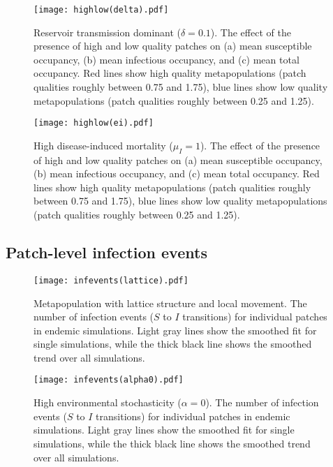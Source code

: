 \documentclass{svjour3}
\begin{document}
\begin{figure}
\centering
\texttt{[image: highlow(delta).pdf]}
\caption{Reservoir transmission dominant ($\delta = 0.1$).  The effect of the presence of high and low quality patches on (a) mean susceptible occupancy, (b) mean infectious occupancy, and (c) mean total occupancy.  Red lines show high quality metapopulations (patch qualities roughly between 0.75 and 1.75), blue lines show low quality metapopulations (patch qualities roughly between 0.25 and 1.25).}
\label{sens_delta}
\end{figure}

\begin{figure}
\centering
\texttt{[image: highlow(ei).pdf]}
\caption{High disease-induced mortality ($\mu_I = 1$).  The effect of the presence of high and low quality patches on (a) mean susceptible occupancy, (b) mean infectious occupancy, and (c) mean total occupancy.  Red lines show high quality metapopulations (patch qualities roughly between 0.75 and 1.75), blue lines show low quality metapopulations (patch qualities roughly between 0.25 and 1.25).}
\label{sens_ei}
\end{figure}

\clearpage

\subsection{Patch-level infection events}

\begin{figure}[h!]
\centering
\texttt{[image: infevents(lattice).pdf]}
\caption{Metapopulation with lattice structure and local movement.  The number of infection events ($S$ to $I$ transitions) for individual patches in endemic simulations.  Light gray lines show the smoothed fit for single simulations, while the thick black line shows the smoothed trend over all simulations.}
\label{infections_lattice}
\end{figure}

\begin{figure}
\centering
\texttt{[image: infevents(alpha0).pdf]}
\caption{High environmental stochasticity ($\alpha = 0$).  The number of infection events ($S$ to $I$ transitions) for individual patches in endemic simulations.  Light gray lines show the smoothed fit for single simulations, while the thick black line shows the smoothed trend over all simulations.}
\label{infections_x0}
\end{figure}
\end{document}
